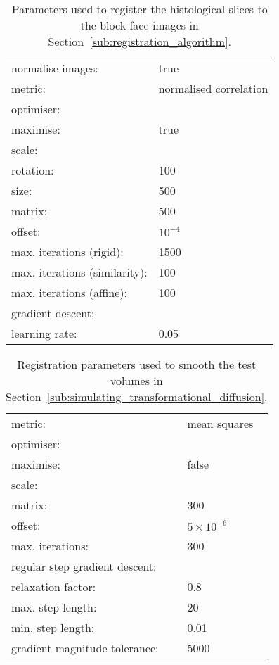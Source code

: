   \begin{table}[h]
    \centering
    \begin{tabular}{|ll|}
      \hline
      normalise images: & true \\
      metric: & normalised correlation \\
      \multicolumn{2}{|l|}{optimiser:} \\
      \quad maximise: & true \\
      \multicolumn{2}{|l|}{\quad scale:} \\
      \quad\quad rotation: & 100 \\
      \quad\quad size: & 500 \\
      \quad\quad matrix: & 500 \\
      \quad\quad offset: & $10^{-4}$ \\
      \quad max. iterations (rigid): & 1500 \\
      \quad max. iterations (similarity): & 100 \\
      \quad max. iterations (affine): & 100 \\
      \multicolumn{2}{|l|}{\quad gradient descent:} \\
      \quad\quad learning rate: & 0.05 \\
      \hline
    \end{tabular}
    
    \caption{Parameters used to register the histological slices to the block face images in Section~\ref{sub:registration_algorithm}.}
    \label{tab:block_face_to_histo}
  \end{table}
  
  \begin{table}[h]
    \centering
    \begin{tabular}{|ll|}
      \hline
      metric: & mean squares \\
      \multicolumn{2}{|l|}{optimiser:} \\
      \quad maximise: & false\\
      \multicolumn{2}{|l|}{\quad scale:} \\
      \quad\quad matrix: & 300 \\
      \quad\quad offset: & $5 \times 10^{-6}$ \\
      \quad max. iterations: & 300 \\
      \multicolumn{2}{|l|}{\quad regular step gradient descent:} \\
      \quad\quad relaxation factor: & 0.8 \\
      \quad\quad max. step length: & 20 \\
      \quad\quad min. step length: & 0.01 \\
      \quad\quad gradient magnitude tolerance: & 5000 \\
      \hline
    \end{tabular}
    
    \caption{Registration parameters used to smooth the test volumes in Section~\ref{sub:simulating_transformational_diffusion}.}
    \label{tab:dummy_histo_to_histo}
  \end{table}
  
